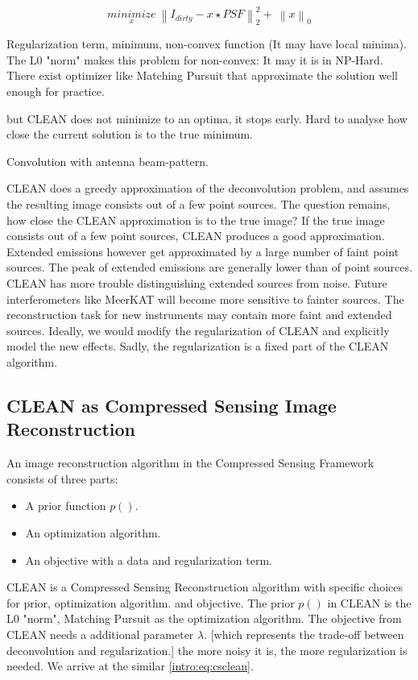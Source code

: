 \begin{equation}\label{intro:eq:clean}
\underset{x}{minimize} \: \left \| I_{dirty} - x \star PSF \right \|_2^2 + \: \left \| x \right \|_0
\end{equation}

Regularization term, minimum, non-convex function (It may have local minima). 
The L0 "norm" makes this problem for non-convex: It may  it is in NP-Hard. There exist optimizer like Matching Pursuit that approximate the solution well enough for practice.

but CLEAN does not minimize to an optima, it stops early. Hard to analyse how close the current solution is to the true minimum.

Convolution with antenna beam-pattern.

CLEAN does a greedy approximation of the deconvolution problem, and assumes the resulting image consists out of a few point sources. The question remains, how close the CLEAN approximation is to the true image? If the true image consists out of a few point sources, CLEAN produces a good approximation. Extended emissions however get approximated by a large number of faint point sources. The peak of extended emissions are generally lower than of point sources. CLEAN has more trouble distinguishing extended sources from noise. Future interferometers like MeerKAT will become more sensitive to fainter sources. The reconstruction task for new instruments may contain more faint and extended sources. Ideally, we would modify the regularization of CLEAN and explicitly model the new effects. Sadly, the regularization is a fixed part of the CLEAN algorithm.


\subsection{CLEAN as Compressed Sensing Image Reconstruction}
An image reconstruction algorithm in the Compressed Sensing Framework consists of three parts:

\begin{itemize}
	\item A prior function $p()$.
	\item An optimization algorithm.
	\item An objective with a data and regularization term.
\end{itemize}

CLEAN is a Compressed Sensing Reconstruction algorithm with specific choices for prior, optimization algorithm. and objective. The prior $p()$ in CLEAN is the L0 "norm", Matching Pursuit as the optimization algorithm. The objective from CLEAN needs a additional parameter $\lambda$.  [which represents the trade-off between deconvolution and regularization.] the more noisy it is, the more regularization is needed. We arrive at the similar \eqref{intro:eq:csclean}.

